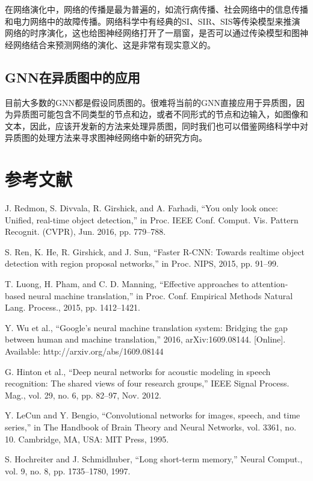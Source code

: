 \documentclass[10pt,journal,compsoc]{IEEEtran}
\begin{document}
在网络演化中，网络的传播是最为普遍的，如流行病传播、社会网络中的信息传播和电力网络中的故障传播。网络科学中有经典的SI、SIR、SIS等传染模型来推演网络的时序演化，这也给图神经网络打开了一扇窗，是否可以通过传染模型和图神经网络结合来预测网络的演化、这是非常有现实意义的。

\subsection{GNN在异质图中的应用}

目前大多数的GNN都是假设同质图的。很难将当前的GNN直接应用于异质图，因为异质图可能包含不同类型的节点和边，或者不同形式的节点和边输入，如图像和文本，因此，应该开发新的方法来处理异质图，同时我们也可以借鉴网络科学中对异质图的处理方法来寻求图神经网络中新的研究方向。


\section{参考文献}

\noindent
[1] J. Redmon, S. Divvala, R. Girshick, and A. Farhadi, “You only look once: Unified, real-time object detection,” in Proc. IEEE Conf. Comput.
Vis. Pattern Recognit. (CVPR), Jun. 2016, pp. 779–788.

\noindent
[2] S. Ren, K. He, R. Girshick, and J. Sun, “Faster R-CNN: Towards realtime object detection with region proposal networks,” in Proc. NIPS, 2015, pp. 91–99.

\noindent
[3] T. Luong, H. Pham, and C. D. Manning, “Effective approaches to attention-based neural machine translation,” in Proc. Conf. Empirical Methods Natural Lang. Process., 2015, pp. 1412–1421.

\noindent
[4] Y. Wu et al., “Google’s neural machine translation system: Bridging the gap between human and machine translation,” 2016, arXiv:1609.08144.
[Online]. Available: http://arxiv.org/abs/1609.08144

\noindent
[5] G. Hinton et al., “Deep neural networks for acoustic modeling in speech recognition: The shared views of four research groups,” IEEE Signal Process. Mag., vol. 29, no. 6, pp. 82–97, Nov. 2012.

\noindent
[6] Y. LeCun and Y. Bengio, “Convolutional networks for images, speech, and time series,” in The Handbook of Brain Theory and Neural Networks, vol. 3361, no. 10. Cambridge, MA, USA: MIT Press, 1995.

\noindent
[7] S. Hochreiter and J. Schmidhuber, “Long short-term memory,” Neural Comput., vol. 9, no. 8, pp. 1735–1780, 1997.
\end{document}
